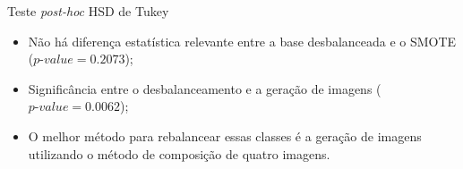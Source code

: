 \documentclass{beamer}
\begin{document}
\begin{frame}{Teste \textit{post-hoc} HSD de Tukey}
  \setlength\leftmargini{1em}
  \begin{itemize}
    \item Não há diferença estatística relevante entre a base desbalanceada e o SMOTE ($\textit{p-value}=0.2073$);
    \item Significância entre o desbalanceamento e a geração de imagens ($\textit{p-value}=0.0062$);
    \item O melhor método para rebalancear essas classes é a geração de imagens utilizando o método de composição de quatro imagens.
  \end{itemize}
\end{frame}
\end{document}
